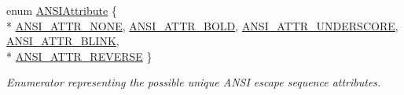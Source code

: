 \begin{DoxyCompactItemize}
enum \hyperlink{namespacechaos_1_1io_1_1format_af01119682ec0bc616b49641e0c2a7ccf}{A\-N\-S\-I\-Attribute} \{ \\*
\hyperlink{namespacechaos_1_1io_1_1format_af01119682ec0bc616b49641e0c2a7ccfa3154b286513beb167bb516ea15f1cfb5}{A\-N\-S\-I\-\_\-\-A\-T\-T\-R\-\_\-\-N\-O\-N\-E}, 
\hyperlink{namespacechaos_1_1io_1_1format_af01119682ec0bc616b49641e0c2a7ccfaada31e77e1e80ea78e0cd08a126271b3}{A\-N\-S\-I\-\_\-\-A\-T\-T\-R\-\_\-\-B\-O\-L\-D}, 
\hyperlink{namespacechaos_1_1io_1_1format_af01119682ec0bc616b49641e0c2a7ccfa2f1d142ccf489cba5710445abd48555f}{A\-N\-S\-I\-\_\-\-A\-T\-T\-R\-\_\-\-U\-N\-D\-E\-R\-S\-C\-O\-R\-E}, 
\hyperlink{namespacechaos_1_1io_1_1format_af01119682ec0bc616b49641e0c2a7ccfacd3671458d96396a0fec66c993244186}{A\-N\-S\-I\-\_\-\-A\-T\-T\-R\-\_\-\-B\-L\-I\-N\-K}, 
\\*
\hyperlink{namespacechaos_1_1io_1_1format_af01119682ec0bc616b49641e0c2a7ccfaa7b58f4c0365d47d2bc98a4587521806}{A\-N\-S\-I\-\_\-\-A\-T\-T\-R\-\_\-\-R\-E\-V\-E\-R\-S\-E}
 \}
\begin{DoxyCompactList}\small\item\em Enumerator representing the possible unique A\-N\-S\-I escape sequence attributes. \end{DoxyCompactList}\end{DoxyCompactItemize}
